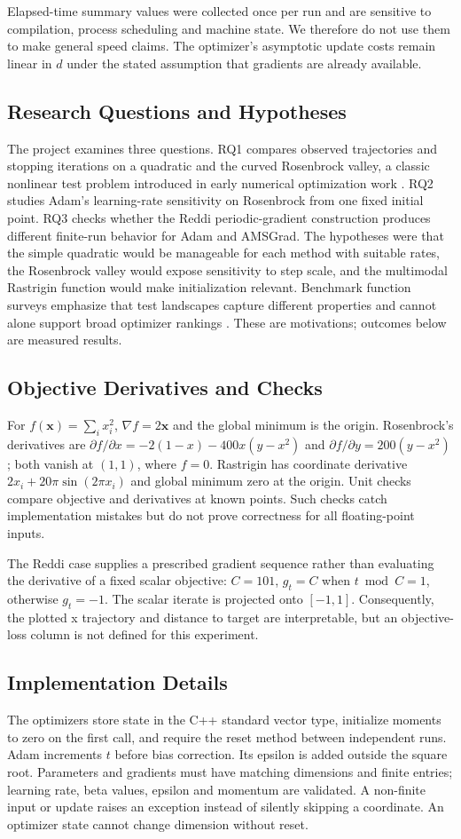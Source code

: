﻿\documentclass[conference]{IEEEtran}
\begin{document}
Elapsed-time summary values were collected once per run and are sensitive to compilation, process scheduling and machine state. We therefore do not use them to make general speed claims. The optimizer's asymptotic update costs remain linear in $d$ under the stated assumption that gradients are already available.
\subsection{Research Questions and Hypotheses}
The project examines three questions. RQ1 compares observed trajectories and stopping iterations on a quadratic and the curved Rosenbrock valley, a classic nonlinear test problem introduced in early numerical optimization work \cite{rosenbrock}. RQ2 studies Adam's learning-rate sensitivity on Rosenbrock from one fixed initial point. RQ3 checks whether the Reddi periodic-gradient construction produces different finite-run behavior for Adam and AMSGrad. The hypotheses were that the simple quadratic would be manageable for each method with suitable rates, the Rosenbrock valley would expose sensitivity to step scale, and the multimodal Rastrigin function would make initialization relevant. Benchmark function surveys emphasize that test landscapes capture different properties and cannot alone support broad optimizer rankings \cite{benchmark}. These are motivations; outcomes below are measured results.
\subsection{Objective Derivatives and Checks}
For $f(\mathbf{x})=\sum_i x_i^2$, $\nabla f=2\mathbf{x}$ and the global minimum is the origin. Rosenbrock's derivatives are $\partial f/\partial x=-2(1-x)-400x(y-x^2)$ and $\partial f/\partial y=200(y-x^2)$; both vanish at $(1,1)$, where $f=0$. Rastrigin has coordinate derivative $2x_i+20\pi\sin(2\pi x_i)$ and global minimum zero at the origin. Unit checks compare objective and derivatives at known points. Such checks catch implementation mistakes but do not prove correctness for all floating-point inputs.

The Reddi case supplies a prescribed gradient sequence rather than evaluating the derivative of a fixed scalar objective: $C=101$, $g_t=C$ when $t\bmod C=1$, otherwise $g_t=-1$. The scalar iterate is projected onto $[-1,1]$. Consequently, the plotted x trajectory and distance to target are interpretable, but an objective-loss column is not defined for this experiment.
\subsection{Implementation Details}
The optimizers store state in the C++ standard vector type, initialize moments to zero on the first call, and require the reset method between independent runs. Adam increments $t$ before bias correction. Its epsilon is added outside the square root. Parameters and gradients must have matching dimensions and finite entries; learning rate, beta values, epsilon and momentum are validated. A non-finite input or update raises an exception instead of silently skipping a coordinate. An optimizer state cannot change dimension without reset.
\end{document}
